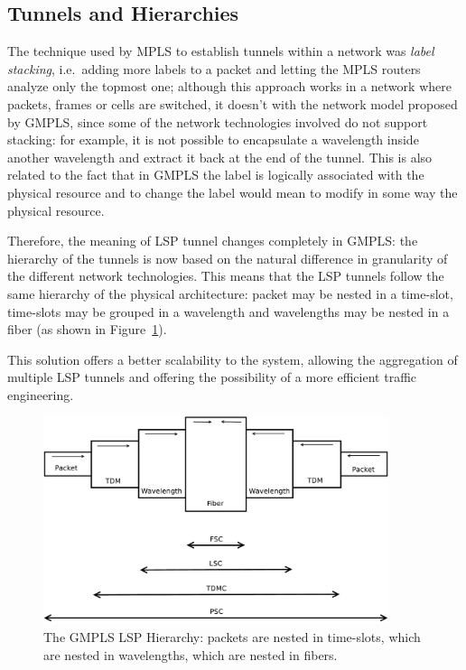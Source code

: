 \documentclass[10pt,a4paper]{report}
\begin{document}
\subsection{Tunnels and Hierarchies}

The technique used by MPLS to establish tunnels within a network was
\textit{label stacking}, i.e.\ adding more labels to a packet and
letting the MPLS routers analyze only the topmost one; although this
approach works in a network where packets, frames or cells are
switched, it doesn't with the network model proposed by GMPLS, since
some of the network technologies involved do not support stacking: for
example, it is not possible to encapsulate a wavelength inside another
wavelength and extract it back at the end of the tunnel. This is also
related to the fact that in GMPLS the label is logically associated
with the physical resource and to change the label would mean to
modify in some way the physical resource.

Therefore, the meaning of LSP tunnel changes completely in GMPLS: the
hierarchy of the tunnels is now based on the natural difference in
granularity of the different network technologies. This means that the
LSP tunnels follow the same hierarchy of the physical architecture:
packet may be nested in a time-slot, time-slots may be grouped in a
wavelength and wavelengths may be nested in a fiber (as shown in
Figure~\ref{fig:gmpls_hierarchy}).

This solution offers a better scalability to the system, allowing the
aggregation of multiple LSP tunnels and offering the possibility of a
more efficient traffic engineering.

\begin{figure}[!htbp]
  \centering
  \includegraphics[width=0.9\textwidth]{img/gmpls_hierarchy}
  \caption[GMPLS LSP Hierarchy]{The GMPLS LSP Hierarchy: packets are
    nested in time-slots, which are nested in wavelengths, which are
    nested in fibers.}
  \label{fig:gmpls_hierarchy}
\end{figure}
\end{document}
